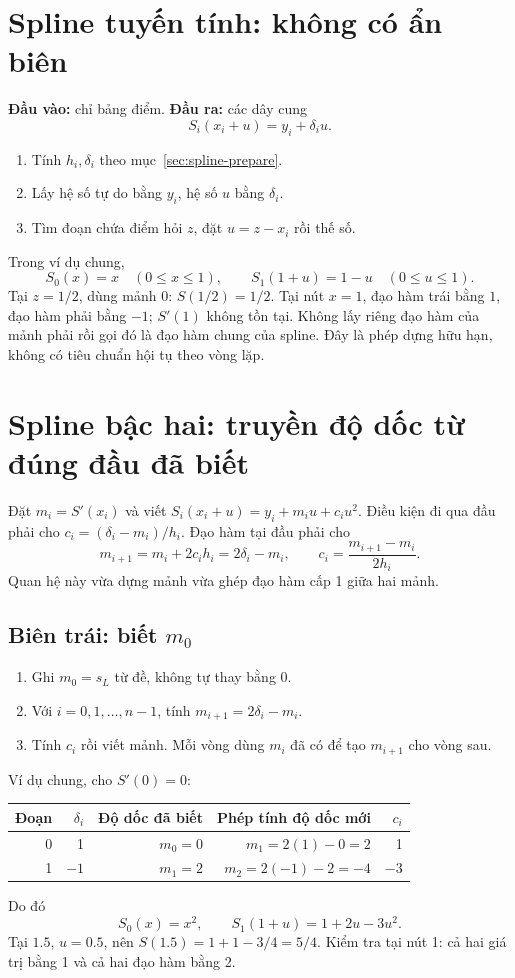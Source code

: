 \section{Spline tuyến tính: không có ẩn biên}
\label{sec:spline-linear}
\textbf{Đầu vào:} chỉ bảng điểm. \textbf{Đầu ra:} các dây cung
\[
S_i(x_i+u)=y_i+\delta_i u.
\]
\begin{enumerate}
\item Tính $h_i,\delta_i$ theo mục~\ref{sec:spline-prepare}.
\item Lấy hệ số tự do bằng $y_i$, hệ số $u$ bằng $\delta_i$.
\item Tìm đoạn chứa điểm hỏi $z$, đặt $u=z-x_i$ rồi thế số.
\end{enumerate}
Trong ví dụ chung,
\[
S_0(x)=x\quad(0\leq x\leq1),\qquad
S_1(1+u)=1-u\quad(0\leq u\leq1).
\]
Tại $z=1/2$, dùng mảnh 0: $S(1/2)=1/2$.
Tại nút $x=1$, đạo hàm trái bằng $1$, đạo hàm phải bằng $-1$; $S'(1)$ không tồn tại.
Không lấy riêng đạo hàm của mảnh phải rồi gọi đó là đạo hàm chung của spline.
Đây là phép dựng hữu hạn, không có tiêu chuẩn hội tụ theo vòng lặp.

\section{Spline bậc hai: truyền độ dốc từ đúng đầu đã biết}
\label{sec:spline-quadratic}
Đặt $m_i=S'(x_i)$ và viết $S_i(x_i+u)=y_i+m_i u+c_i u^2$.
Điều kiện đi qua đầu phải cho $c_i=(\delta_i-m_i)/h_i$.
Đạo hàm tại đầu phải cho
\[
m_{i+1}=m_i+2c_i h_i=2\delta_i-m_i,
\qquad
c_i=\frac{m_{i+1}-m_i}{2h_i}.
\]
Quan hệ này vừa dựng mảnh vừa ghép đạo hàm cấp 1 giữa hai mảnh.

\subsection{Biên trái: biết $m_0$}
\label{sec:spline-quadratic-left}
\begin{enumerate}
\item Ghi $m_0=s_L$ từ đề, không tự thay bằng 0.
\item Với $i=0,1,\ldots,n-1$, tính $m_{i+1}=2\delta_i-m_i$.
\item Tính $c_i$ rồi viết mảnh. Mỗi vòng dùng $m_i$ đã có để tạo $m_{i+1}$ cho vòng sau.
\end{enumerate}
Ví dụ chung, cho $S'(0)=0$:
\begin{center}
\begin{tabular}{rrrrr}
\toprule
Đoạn & $\delta_i$ & Độ dốc đã biết & Phép tính độ dốc mới & $c_i$\\ \midrule
0&1&$m_0=0$&$m_1=2(1)-0=2$&1\\
1&$-1$&$m_1=2$&$m_2=2(-1)-2=-4$&$-3$\\ \bottomrule
\end{tabular}\end{center}
Do đó
\[
S_0(x)=x^2,\qquad S_1(1+u)=1+2u-3u^2.
\]
Tại $1.5$, $u=0.5$, nên $S(1.5)=1+1-3/4=5/4$.
Kiểm tra tại nút 1: cả hai giá trị bằng 1 và cả hai đạo hàm bằng 2.

